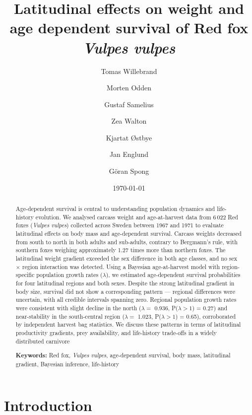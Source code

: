 \documentclass[12pt,a4paper,final,abstract=true,headings=small]{scrartcl}
\title{\textbf{Latitudinal effects on weight and age dependent survival
       of Red fox \emph{Vulpes vulpes}}}
\author[1$*$]{Tomas Willebrand}
\author[1]{Morten Odden}
\author[2]{Gustaf Samelius}
\author[1]{Zea Walton}
\author[1]{Kjartat Østbye}
\author{Jan Englund}
\author[2]{Göran Spong}
\affil[1]{Inland Norway University of Applied Sciences, Evenstad, Norway}
\affil[2]{Swedish University of Agricultural Sciences, Sweden}
\affil[$*$]{\normalfont Corresponding author:
            \href{mailto:tomas.willebrand@inn.no}{tomas.willebrand@inn.no}}
\date{\today}
\begin{document}
\maketitle

\newpage

\begin{abstract}
  Age-dependent survival is central to understanding population dynamics and life-history evolution. We analysed carcass weight and age-at-harvest data from 6\,022 Red foxes (\emph{Vulpes vulpes}) collected across Sweden between 1967 and 1971 to evaluate latitudinal effects on body mass and age-dependent survival. Carcass weights decreased from south to north in both adults and sub-adults, contrary to Bergmann's rule, with southern foxes weighing approximately 1.27 times more than northern foxes. The latitudinal weight gradient exceeded the sex difference in both age classes, and no sex $\times$ region interaction was detected. Using a Bayesian age-at-harvest model with region-specific population growth rates ($\lambda$), we estimated age-dependent survival probabilities for four latitudinal regions and both sexes. Despite the strong latitudinal gradient in body size, survival did not show a corresponding pattern — regional differences were uncertain, with all credible intervals spanning zero. Regional population growth rates were consistent with slight decline in the north ($\lambda =$ 0.936, P($\lambda > 1$) = 0.27) and near-stability in the south-central region ($\lambda =$ 1.023, P($\lambda > 1$) = 0.65), corroborated by independent harvest bag statistics. We discuss these patterns in terms of latitudinal productivity gradients, prey availability, and life-history trade-offs in a widely distributed carnivore


  \medskip

  \noindent\textbf{Keywords:} Red fox, \emph{Vulpes vulpes}, age-dependent survival, body mass, latitudinal gradient, Bayesian inference, life-history
\end{abstract}

\newpage

\section*{Introduction}
\end{document}
